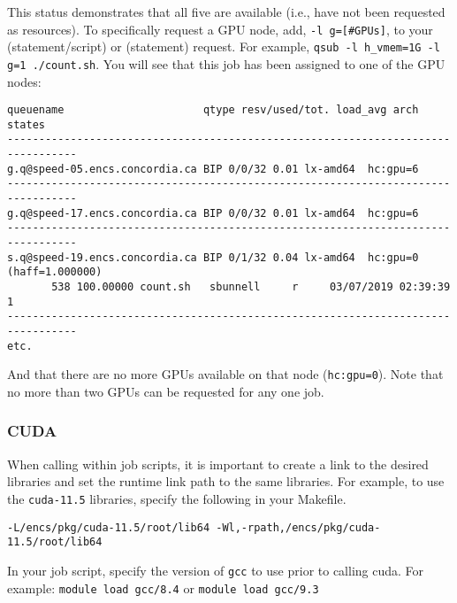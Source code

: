 \documentclass{easychair}
\begin{document}
This status demonstrates that all five are available (i.e., have not been 
requested as resources). To specifically request a GPU node, add,
\texttt{-l g=[\#GPUs]}, to your  (statement/script) or
 (statement) request. For example,
\texttt{qsub -l h\_vmem=1G -l g=1 ./count.sh}. You 
will see that this job has been assigned to one of the GPU nodes:

\small
\begin{verbatim}
queuename                      qtype resv/used/tot. load_avg arch          states
--------------------------------------------------------------------------------- 
g.q@speed-05.encs.concordia.ca BIP 0/0/32 0.01 lx-amd64  hc:gpu=6 
--------------------------------------------------------------------------------- 
g.q@speed-17.encs.concordia.ca BIP 0/0/32 0.01 lx-amd64  hc:gpu=6 
--------------------------------------------------------------------------------- 
s.q@speed-19.encs.concordia.ca BIP 0/1/32 0.04 lx-amd64  hc:gpu=0 (haff=1.000000) 
       538 100.00000 count.sh   sbunnell     r     03/07/2019 02:39:39     1
---------------------------------------------------------------------------------
etc. 
\end{verbatim}
\normalsize

And that there are no more GPUs available on that node (\texttt{hc:gpu=0}). Note
that no more than two GPUs can be requested for any one job. 

\subsubsection{CUDA}

When calling  within job scripts, it is important to create a link to
the desired  libraries and set the runtime link path to the same libraries. 
For example, to use the \texttt{cuda-11.5} libraries, specify the following in 
your Makefile.

\begin{verbatim}
-L/encs/pkg/cuda-11.5/root/lib64 -Wl,-rpath,/encs/pkg/cuda-11.5/root/lib64
\end{verbatim}

In your job script, specify the version of \texttt{gcc} to use prior to calling 
cuda. For example: 
   \texttt{module load gcc/8.4}
or
   \texttt{module load gcc/9.3}

\end{document}
